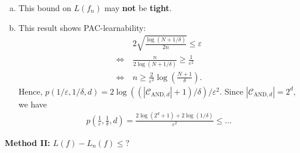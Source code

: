 \documentclass[twoside]{article}
\begin{document}
\begin{remark}
    \begin{enumerate}[(a)]
        \item This bound on $L(f_n)$ may \textbf{not} be \textbf{tight}.
        \item This result shows PAC-learnability:
        \begin{align*}
            & 2 \sqrt{ \frac{\log(N+1/\delta)}{2n} } \le \varepsilon
            \\ \Leftrightarrow~ &
            \frac{n}{ 2\log( N+1 /\delta ) } \ge \frac{1}{ \varepsilon^2}
            \\ \Leftrightarrow~ &
            n \ge \frac{2}{ \varepsilon^2 } \log\left( \frac{N+1}{\delta} \right).
        \end{align*}
        Hence, $p(1/\varepsilon, 1/\delta, d )  = 2\log\left((|\mathcal{C}_{\text{AND},d}|+1)/\delta \right)/\varepsilon^2$. Since $|\mathcal{C}_{\text{AND},d}|=2^d$, we have
        \begin{align*}
            p\left( \frac{1}{\varepsilon}, \frac{1}{\delta}, d \right) = \frac{ 2\log\left(2^d+1\right) + 2\log(1/\delta) }{\varepsilon^2} \le \ldots
        \end{align*}
    \end{enumerate}
\end{remark}



\noindent
\textbf{Method II:} $L(f) - L_n(f) \le ?$
\end{document}
